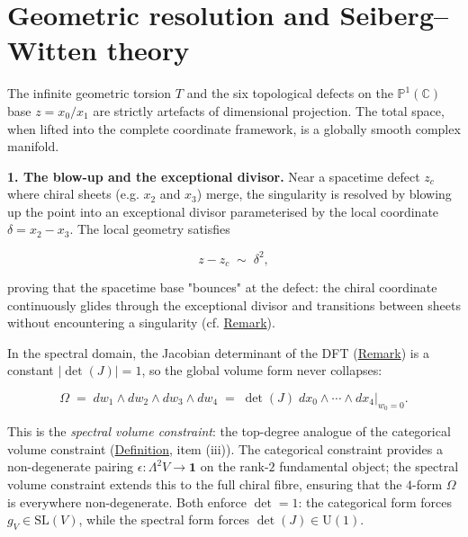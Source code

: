 \section{Geometric resolution and Seiberg--Witten theory}
\label{sec:seiberg-witten}

\begin{remark}
  \label{rem:seiberg-witten}
The infinite geometric torsion $T$ and the six topological defects on the
$\mathbb{P}^1(\mathbb{C})$ base $z=x_0/x_1$ are strictly artefacts of
dimensional projection.  The total space, when lifted into the
complete coordinate framework, is a globally smooth complex manifold.

\textbf{1. The blow-up and the exceptional divisor.}
Near a spacetime defect $z_c$ where chiral sheets (e.g. $x_2$ and
$x_3$) merge, the singularity is resolved by blowing up the point into
an exceptional divisor parameterised by the local coordinate
$\delta=x_2-x_3$.  The local geometry satisfies

\[
z-z_c\;\sim\;\delta^2,
\]

proving that the spacetime base "bounces" at the defect: the chiral
coordinate continuously glides through the exceptional divisor and
transitions between sheets without encountering a singularity
(cf. \hyperref[rem:brings-smoothness]{Remark}).

In the spectral domain, the Jacobian determinant of the DFT
(\hyperref[rem:lagrange-resolvents]{Remark}) is a constant
$\lvert\det(J)\rvert=1$, so the global volume form never collapses:

\begin{equation}\label{eq:spectral-volume-form}
  \Omega \;=\; dw_1\wedge dw_2\wedge dw_3\wedge dw_4
  \;=\; \det(J)\;dx_0\wedge\cdots\wedge dx_4\Big|_{w_0=0}.
\end{equation}

This is the \emph{spectral volume constraint}: the top-degree analogue
of the categorical volume constraint
(\hyperref[def:quantum-observable-universe]{Definition}, item (iii)).  The categorical
constraint provides a non-degenerate pairing
$\epsilon \colon \Lambda^2 V \to \mathbf{1}$ on the rank-$2$ fundamental
object; the spectral volume constraint
extends this to the full chiral fibre, ensuring that the $4$-form $\Omega$
is everywhere non-degenerate.  Both enforce $\det = 1$: the categorical
form forces $g_V \in \mathrm{SL}(V)$, while the spectral form forces
$\det(J) \in \mathrm{U}(1)$.


\end{remark}
